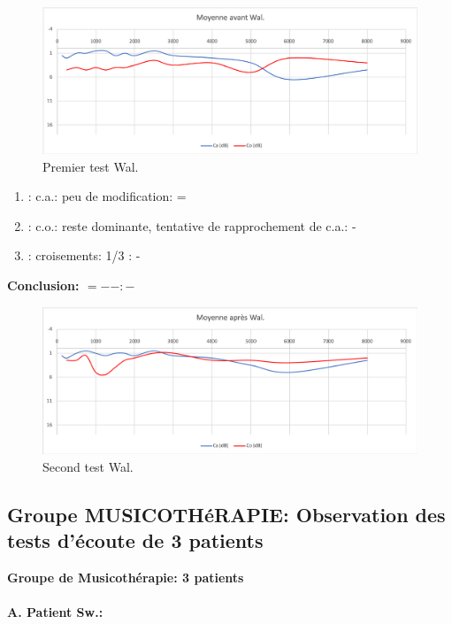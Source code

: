 \begin{figure}[th]
\centering
\includegraphics[width=0.7\linewidth]{images/graphiques/wal_pre.png}
\caption[Moyenne OG+OD]{Premier test Wal.}

\end{figure}

	\begin{enumerate}

 		\item : c.a.: peu de modification: =

 		\item : c.o.: reste dominante, tentative de rapprochement de c.a.: -
 		\item : croisements: 1/3 :  -

                \end{enumerate}

                \textbf{ Conclusion:  $= -  -        : -$ }

               \begin{figure}[th]
\centering
\includegraphics[width=0.7\linewidth]{images/graphiques/wal_post.png}
\caption[Moyenne OG+OD]{Second test Wal.}

\label{groupecontroleimage1}
\end{figure}
\subsection{Groupe MUSICOTHéRAPIE: Observation des tests d'écoute de 3 patients}
  \textbf{Groupe de Musicothérapie: 3 patients}

\paragraph{ A. Patient Sw.:}



